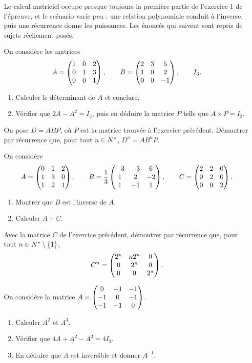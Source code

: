\begin{annales}
Le calcul matriciel occupe presque toujours la première partie de l'exercice 1
de l'épreuve, et le scénario varie peu : une relation polynomiale conduit à
l'inverse, puis une récurrence donne les puissances. Les énoncés qui suivent
sont repris de sujets réellement posés.

On considère les matrices
\[
  A = \begin{pmatrix} 1 & 0 & 2 \\ 0 & 1 & 3 \\ 0 & 0 & 1 \end{pmatrix}, \qquad
  B = \begin{pmatrix} 2 & 3 & 5 \\ 1 & 0 & 2 \\ 0 & 0 & -1 \end{pmatrix}, \qquad I_{3}.
\]
\begin{enumerate}[label=\textbf{\arabic*)}, leftmargin=*, itemsep=0.15em]
  \item Calculer le déterminant de $A$ et conclure.
  \item Vérifier que $2A-A^{2} = I_{3}$, puis en déduire la matrice $P$ telle
        que $A \times P = I_{3}$.
\end{enumerate}

On pose $D = ABP$, où $P$ est la matrice trouvée à l'exercice précédent.
Démontrer par récurrence que, pour tout $n \in N^{*}$,
$D^{n} = AB^{n}P$.

On considère
\[
  A = \begin{pmatrix} 0 & 1 & 2 \\ 1 & 3 & 0 \\ 1 & 2 & 1 \end{pmatrix}, \qquad
  B = \frac13\begin{pmatrix} -3 & -3 & 6 \\ 1 & 2 & -2 \\ 1 & -1 & 1 \end{pmatrix}, \qquad
  C = \begin{pmatrix} 2 & 2 & 0 \\ 0 & 2 & 0 \\ 0 & 0 & 2 \end{pmatrix}.
\]
\begin{enumerate}[label=\textbf{\arabic*)}, leftmargin=*, itemsep=0.15em]
  \item Montrer que $B$ est l'inverse de $A$.
  \item Calculer $A+C$.
\end{enumerate}

Avec la matrice $C$ de l'exercice précédent, démontrer par récurrence que,
pour tout $n \in N^{*}\setminus\{1\}$,
\[
  C^{n} = \begin{pmatrix} 2^{n} & n2^{n} & 0 \\ 0 & 2^{n} & 0 \\ 0 & 0 & 2^{n} \end{pmatrix}.
\]

On considère la matrice
$A = \begin{pmatrix} 0 & -1 & -1 \\ -1 & 0 & -1 \\ -1 & -1 & 0 \end{pmatrix}$.
\begin{enumerate}[label=\textbf{\arabic*)}, leftmargin=*, itemsep=0.15em]
  \item Calculer $A^{2}$ et $A^{3}$.
  \item Vérifier que $4A+A^{2}-A^{3} = 4I_{3}$.
  \item En déduire que $A$ est inversible et donner $A^{-1}$.
\end{enumerate}


\end{annales}

